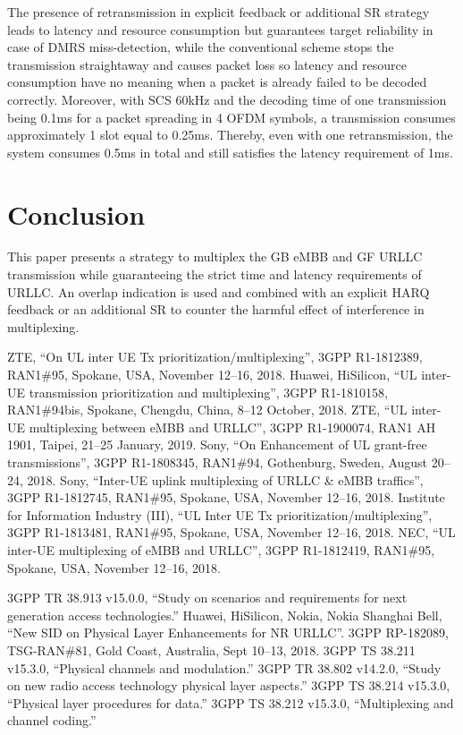 \documentclass[conference]{IEEEtran}
\begin{document}
The presence of retransmission in explicit feedback or additional SR strategy leads to latency and resource consumption but guarantees target reliability in case of DMRS miss-detection, while the conventional scheme stops the transmission straightaway and causes packet loss so latency and resource consumption have no meaning when a packet is already failed to be decoded correctly. Moreover, with SCS 60kHz and the decoding time of one transmission being 0.1ms for a packet spreading in 4 OFDM symbols, a transmission consumes approximately 1 slot equal to 0.25ms. Thereby, even with one retransmission, the system consumes 0.5ms in total and still satisfies the latency requirement of 1ms.

\section{Conclusion}\label{IV}

This paper presents a strategy to multiplex the GB eMBB and GF URLLC transmission while guaranteeing the strict time and latency requirements of URLLC. An overlap indication is used and combined with an explicit HARQ feedback or an additional SR to counter the harmful effect of interference in multiplexing.

\begin{thebibliography}{00}

  ZTE, ``On UL inter UE Tx prioritization/multiplexing'', 3GPP R1-1812389, RAN1\#95, Spokane, USA, November 12--16, 2018.
 Huawei, HiSilicon, ``UL inter-UE transmission prioritization and multiplexing'', 3GPP R1-1810158, RAN1\#94bis, Spokane, Chengdu, China, 8--12 October, 2018.
 ZTE, ``UL inter-UE multiplexing between eMBB and URLLC'', 3GPP R1-1900074, RAN1 AH 1901, Taipei,  21--25 January, 2019.
 Sony, ``On Enhancement of UL grant-free transmissions'', 3GPP R1-1808345, RAN1\#94, Gothenburg, Sweden, August 20--24, 2018.
  Sony, ``Inter-UE uplink multiplexing of URLLC \& eMBB traffics'', 3GPP R1-1812745, RAN1\#95, Spokane, USA, November 12--16, 2018.
  Institute for Information Industry (III), ``UL Inter UE Tx prioritization/multiplexing'', 3GPP R1-1813481, RAN1\#95, Spokane, USA, November 12--16, 2018.
  NEC, ``UL inter-UE multiplexing of eMBB and URLLC'', 3GPP R1-1812419, RAN1\#95, Spokane, USA, November 12--16, 2018.

 3GPP TR 38.913 v15.0.0, ``Study on scenarios and requirements for next generation access technologies.''
 Huawei, HiSilicon, Nokia, Nokia Shanghai Bell, ``New SID on Physical Layer Enhancements for NR URLLC''. 3GPP RP-182089, TSG-RAN\#81, Gold Coast, Australia, Sept 10--13, 2018.
 3GPP TS 38.211 v15.3.0, ``Physical channels and modulation.''
 3GPP TR 38.802 v14.2.0, ``Study on new radio access technology physical layer aspects.''
 3GPP TS 38.214 v15.3.0, ``Physical layer procedures for data.''
 3GPP TS 38.212 v15.3.0, ``Multiplexing and channel coding.''

\end{thebibliography}
\vspace{12pt}
\end{document}
